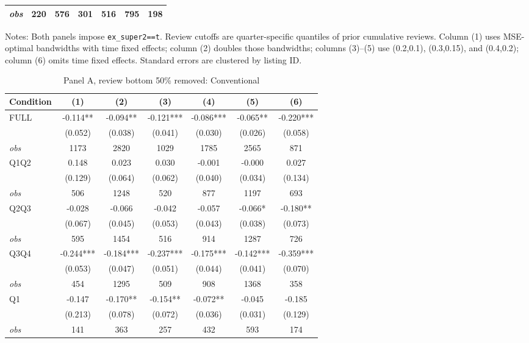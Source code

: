 \begin{table}[!htbp]
\begin{tabular}{lcccccc}
\textit{obs} & 220 & 576 & 301 & 516 & 795 & 198 \\
\bottomrule
\end{tabular}
\begin{minipage}{0.98\textwidth}\footnotesize
Notes: Both panels impose \texttt{ex\_super2==t}. Review cutoffs are quarter-specific quantiles of prior cumulative reviews. Column (1) uses MSE-optimal bandwidths with time fixed effects; column (2) doubles those bandwidths; columns (3)--(5) use (0.2,0.1), (0.3,0.15), and (0.4,0.2); column (6) omits time fixed effects. Standard errors are clustered by listing ID.
\end{minipage}
\end{table}

\begin{table}[!htbp]
\centering
\caption{Panel A, review bottom 50\% removed: Conventional}
\begin{tabular}{lcccccc}
\toprule
Condition & (1) & (2) & (3) & (4) & (5) & (6) \\
\midrule
FULL & -0.114** & -0.094** & -0.121*** & -0.086*** & -0.065** & -0.220*** \\
 & (0.052) & (0.038) & (0.041) & (0.030) & (0.026) & (0.058) \\
\textit{obs} & 1173 & 2820 & 1029 & 1785 & 2565 & 871 \\
Q1Q2 & 0.148 & 0.023 & 0.030 & -0.001 & -0.000 & 0.027 \\
 & (0.129) & (0.064) & (0.062) & (0.040) & (0.034) & (0.134) \\
\textit{obs} & 506 & 1248 & 520 & 877 & 1197 & 693 \\
Q2Q3 & -0.028 & -0.066 & -0.042 & -0.057 & -0.066* & -0.180** \\
 & (0.067) & (0.045) & (0.053) & (0.043) & (0.038) & (0.073) \\
\textit{obs} & 595 & 1454 & 516 & 914 & 1287 & 726 \\
Q3Q4 & -0.244*** & -0.184*** & -0.237*** & -0.175*** & -0.142*** & -0.359*** \\
 & (0.053) & (0.047) & (0.051) & (0.044) & (0.041) & (0.070) \\
\textit{obs} & 454 & 1295 & 509 & 908 & 1368 & 358 \\
Q1 & -0.147 & -0.170** & -0.154** & -0.072** & -0.045 & -0.185 \\
 & (0.213) & (0.078) & (0.072) & (0.036) & (0.031) & (0.129) \\
\textit{obs} & 141 & 363 & 257 & 432 & 593 & 174 \\

\end{tabular}
\end{table}
